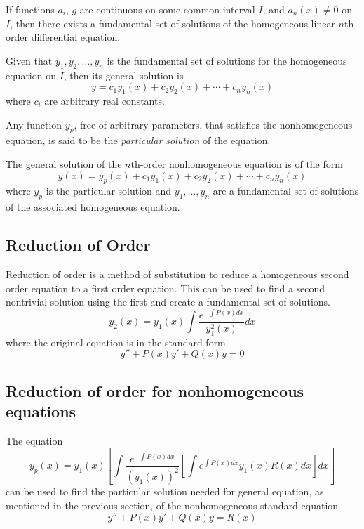 \begin{theorem}
    If functions $a_i$, $g$ are continuous on some common interval $I$, and $a_n(x) \ne 0$ on $I$, then there exists a fundamental set of solutions of the homogeneous linear $n$th-order differential equation.
\end{theorem}

Given that $y_1, y_2, \ldots, y_n$ is the fundamental set of solutions for the homogeneous equation on $I$, then its general solution is
\[
    y = c_1 y_1(x) + c_2 y_2(x) + \cdots + c_n y_n(x)
\]
where $c_i$ are arbitrary real constants.

Any function $y_p$, free of arbitrary parameters, that satisfies the nonhomogeneous equation, is said to be the \textit{particular solution} of the equation.

\begin{theorem}
    The general solution of the $n$th-order nonhomogeneous equation is of the form
    \[
        y(x) = y_p(x) + c_1 y_1(x) + c_2 y_2(x) + \cdots + c_n y_n(x)
    \]
    where $y_p$ is the particular solution and $y_1, \ldots, y_n$ are a fundamental set of solutions of the associated homogeneous equation.
\end{theorem}

\subsection{Reduction of Order}

Reduction of order is a method of substitution to reduce a homogeneous second order equation to a first order equation. This can be used to find a second nontrivial solution using the first and create a fundamental set of solutions.
\[
    y_2(x) = y_1(x) \int \frac{e^{-\int P(x)dx}}{y_1^2(x)}dx
\]
where the original equation is in the standard form
\[
    y'' + P(x)y' + Q(x)y = 0
\]

\subsection{Reduction of order for nonhomogeneous equations}

The equation
\[
    y_p(x) = y_1(x) \left[ \int \frac{e^{-\int P(x)dx}}{(y_1(x))^2} \left[ \int e^{\int P(x)dx} y_1(x) R(x)dx \right] dx \right]
\]
can be used to find the particular solution needed for general equation, as mentioned in the previous section, of the nonhomogeneous standard equation
\[
    y'' + P(x)y' + Q(x)y = R(x)
\]

